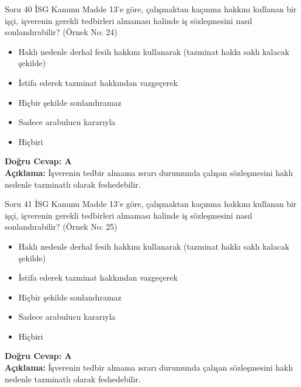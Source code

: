 \documentclass[12pt,a4paper]{article}
\begin{document}
\begin{testcard}{Soru 40}
    İSG Kanunu Madde 13'e göre, çalışmaktan kaçınma hakkını kullanan bir işçi, işverenin gerekli tedbirleri almaması halinde iş sözleşmesini nasıl sonlandırabilir? (Örnek No: 24)
    \begin{itemize}
        \item[A)] Haklı nedenle derhal fesih hakkını kullanarak (tazminat hakkı saklı kalacak şekilde)
        \item[B)] İstifa ederek tazminat hakkından vazgeçerek
        \item[C)] Hiçbir şekilde sonlandıramaz
        \item[D)] Sadece arabulucu kararıyla
        \item[E)] Hiçbiri
    \end{itemize}
    \tcblower
    \textbf{Doğru Cevap: A} \\
    \textbf{Açıklama:} İşverenin tedbir almama ısrarı durumunda çalışan sözleşmesini haklı nedenle tazminatlı olarak feshedebilir.
\end{testcard}

\begin{testcard}{Soru 41}
    İSG Kanunu Madde 13'e göre, çalışmaktan kaçınma hakkını kullanan bir işçi, işverenin gerekli tedbirleri almaması halinde iş sözleşmesini nasıl sonlandırabilir? (Örnek No: 25)
    \begin{itemize}
        \item[A)] Haklı nedenle derhal fesih hakkını kullanarak (tazminat hakkı saklı kalacak şekilde)
        \item[B)] İstifa ederek tazminat hakkından vazgeçerek
        \item[C)] Hiçbir şekilde sonlandıramaz
        \item[D)] Sadece arabulucu kararıyla
        \item[E)] Hiçbiri
    \end{itemize}
    \tcblower
    \textbf{Doğru Cevap: A} \\
    \textbf{Açıklama:} İşverenin tedbir almama ısrarı durumunda çalışan sözleşmesini haklı nedenle tazminatlı olarak feshedebilir.
\end{testcard}
\end{document}
